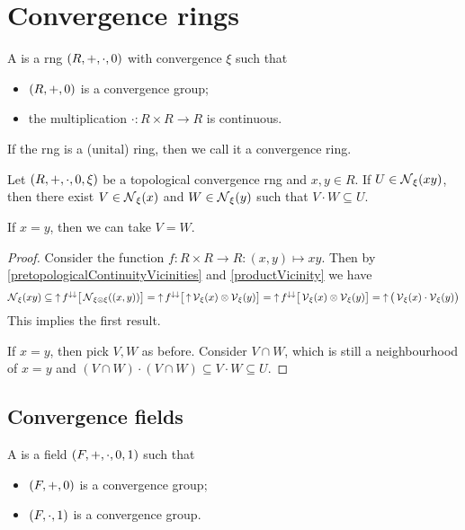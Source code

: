 \chapter{Convergence rings}
\begin{definition}
A  is a rng $\sSet{R, +, \cdot, 0}$ with convergence $\xi$ such that
\begin{itemize}
\item $\sSet{R,+,0}$ is a convergence group;
\item the multiplication $\cdot: R\times R\to R$ is continuous.
\end{itemize}
If the rng is a (unital) ring, then we call it a convergence ring.
\end{definition}

\begin{lemma} \label{ringVicinityFactorisation}
Let $\sSet{R, +,\cdot, 0, \xi}$ be a topological convergence rng and $x,y\in R$. If $U\in \operatorname{\mathcal{N}}_\xi(xy)$, then there exist $V\in \operatorname{\mathcal{N}}_\xi(x)$ and $W\in \operatorname{\mathcal{N}}_\xi(y)$ such that $V\cdot W\subseteq U$.

If $x=y$, then we can take $V = W$.
\end{lemma}
\begin{proof}
Consider the function $f: R\times R \to R: (x,y)\mapsto xy$. Then by \ref{pretopologicalContinuityVicinities} and \ref{productVicinity} we have
\[ \operatorname{\mathcal{N}}_\xi(xy) \subseteq \operatorname{\uparrow} f^{\downarrow\downarrow}\big[\operatorname{\mathcal{N}}_{\xi\otimes\xi}((x,y))\big] = \operatorname{\uparrow} f^{\downarrow\downarrow}\big[\operatorname{\uparrow} \operatorname{\mathcal{V}}_\xi(x)\otimes \operatorname{\mathcal{V}}_\xi(y)\big] = \operatorname{\uparrow} f^{\downarrow\downarrow}\big[\operatorname{\mathcal{V}}_\xi(x)\otimes \operatorname{\mathcal{V}}_\xi(y)\big] = \operatorname{\uparrow} \big(\operatorname{\mathcal{V}}_\xi(x)\cdot \operatorname{\mathcal{V}}_\xi(y)\big) \]
This implies the first result.

If $x=y$, then pick $V,W$ as before. Consider $V\cap W$, which is still a neighbourhood of $x=y$ and $(V\cap W)\cdot(V\cap W) \subseteq V\cdot W \subseteq U$.
\end{proof}

\section{Convergence fields}
\begin{definition}
A  is a field $\sSet{F, +, \cdot, 0,1}$ such that
\begin{itemize}
\item $\sSet{F,+,0}$ is a convergence group;
\item $\sSet{F,\cdot, 1}$ is a convergence group.
\end{itemize}
\end{definition}

